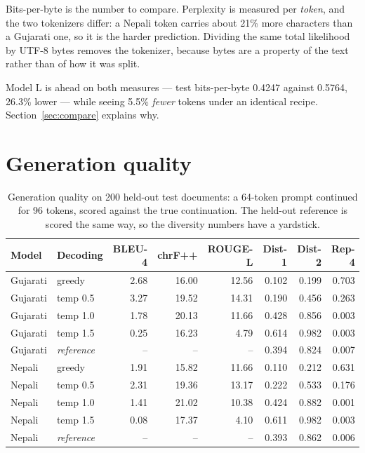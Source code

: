 \documentclass[11pt,a4paper]{article}
\begin{document}
Bits-per-byte is the number to compare. Perplexity is measured per \emph{token},
and the two tokenizers differ: a Nepali token carries about 21\% more characters
than a Gujarati one, so it is the harder prediction. Dividing the same total
likelihood by UTF-8 bytes removes the tokenizer, because bytes are a property of
the text rather than of how it was split.

Model L is ahead on both measures --- test bits-per-byte 0.4247 against
0.5764, 26.3\% lower --- while seeing 5.5\%
\emph{fewer} tokens under an identical recipe. Section~\ref{sec:compare}
explains why.


\section{Generation quality}

\begin{table}[H]
\centering
\small
\begin{tabular}{llrrrrrr}
\toprule
\textbf{Model} & \textbf{Decoding} & \textbf{BLEU-4} & \textbf{chrF++} & \textbf{ROUGE-L} & \textbf{Dist-1} & \textbf{Dist-2} & \textbf{Rep-4} \\
\midrule
Gujarati & greedy & 2.68 & 16.00 & 12.56 & 0.102 & 0.199 & 0.703 \\
Gujarati & temp 0.5 & 3.27 & 19.52 & 14.31 & 0.190 & 0.456 & 0.263 \\
Gujarati & temp 1.0 & 1.78 & 20.13 & 11.66 & 0.428 & 0.856 & 0.003 \\
Gujarati & temp 1.5 & 0.25 & 16.23 & 4.79 & 0.614 & 0.982 & 0.003 \\
Gujarati & \emph{reference} & -- & -- & -- & 0.394 & 0.824 & 0.007 \\
Nepali & greedy & 1.91 & 15.82 & 11.66 & 0.110 & 0.212 & 0.631 \\
Nepali & temp 0.5 & 2.31 & 19.36 & 13.17 & 0.222 & 0.533 & 0.176 \\
Nepali & temp 1.0 & 1.41 & 21.02 & 10.38 & 0.424 & 0.882 & 0.001 \\
Nepali & temp 1.5 & 0.08 & 17.37 & 4.10 & 0.611 & 0.982 & 0.003 \\
Nepali & \emph{reference} & -- & -- & -- & 0.393 & 0.862 & 0.006 \\
\bottomrule
\end{tabular}
\caption{Generation quality on 200 held-out test documents: a 64-token prompt continued for 96 tokens, scored against the true continuation. The held-out reference is scored the same way, so the diversity numbers have a yardstick.}
\label{tab:gen}
\end{table}
\end{document}

